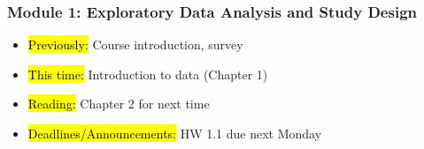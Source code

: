 
\begin{frame}
    \frametitle{Module 1: Exploratory Data Analysis and Study Design}
    \begin{itemize}
        \item \hl{Previously: }Course introduction, survey
        \item \hl{This time: }Introduction to data (Chapter 1)
        \item \hl{Reading: }Chapter 2 for next time
        \item \hl{Deadlines/Announcements: }HW 1.1 due next Monday
    \end{itemize}
    
\end{frame}
    